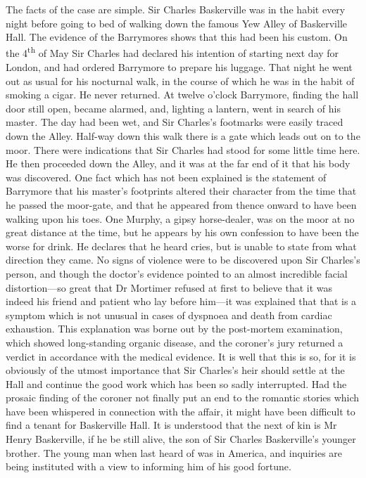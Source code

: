 \documentclass[paper=5.5in:8.5in,BCOR=7mm,twoside,DIV=calc,12pt,usegeometry,openany,chapterprefix,endperiod,headings=big]{scrbook} %
\begin{document}
\textsf{The facts of the case are simple. Sir Charles Baskerville was in the habit every night before going to bed of walking down the famous Yew Alley of Baskerville Hall. The evidence of the Barrymores shows that this had been his custom. On the 4\textsuperscript{th} of May Sir Charles had declared his intention of starting next day for London, and had ordered Barrymore to prepare his luggage. That night he went out as usual for his nocturnal walk, in the course of which he was in the habit of smoking a cigar. He never returned. At twelve o'clock Barrymore, finding the hall door still open, became alarmed, and, lighting a lantern, went in search of his master. The day had been wet, and Sir Charles's footmarks were easily traced down the Alley. Half-way down this walk there is a gate which leads out on to the moor. There were indications that Sir Charles had stood for some little time here. He then proceeded down the Alley, and it was at the far end of it that his body was discovered. One fact which has not been explained is the statement of Barrymore that his master's footprints altered their character from the time that he passed the moor-gate, and that he appeared from thence onward to have been walking upon his toes. One Murphy, a gipsy horse-dealer, was on the moor at no great distance at the time, but he appears by his own confession to have been the worse for drink. He declares that he heard cries, but is unable to state from what direction they came. No signs of violence were to be discovered upon Sir Charles's person, and though the doctor's evidence pointed to an almost incredible facial distortion---so great that Dr Mortimer refused at first to believe that it was indeed his friend and patient who lay before him---it was explained that that is a symptom which is not unusual in cases of dyspnoea and death from cardiac exhaustion. This explanation was borne out by the post-mortem examination, which showed long-standing organic disease, and the coroner's jury returned a verdict in accordance with the medical evidence. It is well that this is so, for it is obviously of the utmost importance that Sir Charles's heir should settle at the Hall and continue the good work which has been so sadly interrupted. Had the prosaic finding of the coroner not finally put an end to the romantic stories which have been whispered in connection with the affair, it might have been difficult to find a tenant for Baskerville Hall. It is understood that the next of kin is Mr Henry Baskerville, if he be still alive, the son of Sir Charles Baskerville's younger brother. The young man when last heard of was in America, and inquiries are being instituted with a view to informing him of his good fortune.} \\
\end{document}
